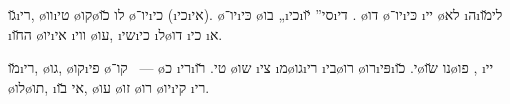 
\u{גו}\i{רי}, \o{וו}\i{טי} \o{קו}\o{לו}  \u{כו} \o{יו}־\i{כי} (\i{כי}\i{אי}). \o{יו}־\i{כּי} \o{בו}  „\i{כי}\i{סי}” \u{יו}\i{די}  . \o{דו}  \o{יו}־\i{כּי} \i{יי} \o{לא} \i{ה}\i{לי}\u{מו}  \i{ה}\u{חו}   \o{יו}\i{אי} \i{ווי} \o{עו},   \i{שי}\i{כי} \i{ל}\o{דו} \i{כי}   \i{א}.



\u{מו}\i{רי}, \o{גו}, \o{קו}\i{פי} \o{קו}־ ~— \o{כ}   \i{רי}\i{טי}. \u{רו} \o{שו} \i{צי} \i{מ}\o{גו}\i{רי} \i{בי}\o{רו}  \o{רו}\i{פּי}\i{י}. \u{כו}\o{נו} \u{שו}\o{פו}  , \i{יי} \o{לו}\o{תו}, \i{אי}  \u{בו}, \o{עו}  \o{זו}  \o{רו} \o{יו}\i{קי} \i{רי}.
